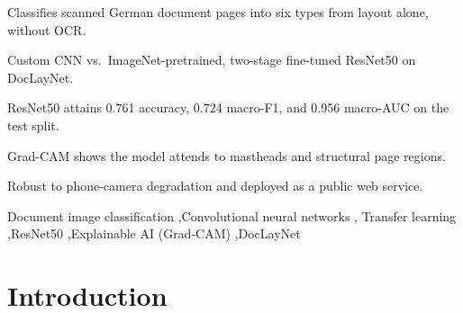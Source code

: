 \documentclass[preprint,12pt]{elsarticle}
\begin{document}
\begin{frontmatter}
\begin{graphicalabstract}
\end{graphicalabstract}

\begin{highlights}
\item Classifies scanned German document pages into six types from layout alone, without OCR.
\item Custom CNN vs.\ ImageNet-pretrained, two-stage fine-tuned ResNet50 on DocLayNet.
\item ResNet50 attains 0.761 accuracy, 0.724 macro-F1, and 0.956 macro-AUC on the test split.
\item Grad-CAM shows the model attends to mastheads and structural page regions.
\item Robust to phone-camera degradation and deployed as a public web service.
\end{highlights}

\begin{keyword}
Document image classification \sep Convolutional neural networks \sep
Transfer learning \sep ResNet50 \sep Explainable AI (Grad-CAM) \sep DocLayNet
\end{keyword}

\end{frontmatter}


\section{Introduction}
\end{document}
